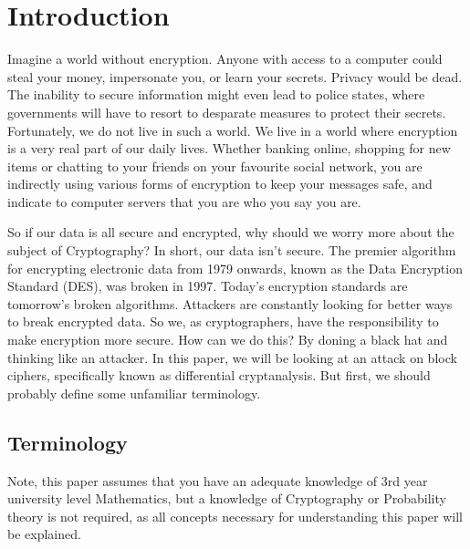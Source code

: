 



\chapter{Introduction} \label{c:introduction}
Imagine a world without encryption. Anyone with access to a computer
could steal your money, impersonate you, or learn your secrets.
Privacy would be dead. The inability to secure information might
even lead to police states, where governments will have to resort
to desparate measures to protect their secrets.
Fortunately, we do not live in such a world. We live in a world 
where encryption is a very real part of our daily lives. Whether
banking online, shopping for new items or chatting to your friends
on your favourite social network, you are indirectly using various
forms of encryption to keep your messages safe, and indicate to
computer servers that you are who you say you are.

So if our data is all secure and encrypted, why should we worry 
more about the subject of Cryptography? In short, our data isn't
secure. The premier algorithm for encrypting electronic data from
1979 onwards, known as the Data Encryption Standard (DES), was
broken in 1997. Today's encryption standards are tomorrow's broken
algorithms. Attackers are constantly looking for better ways
to break encrypted data. So we, as cryptographers, have the 
responsibility to make encryption more secure. How can we do this? 
By doning a black hat and thinking like an attacker. In this paper, 
we will be looking at an attack on block ciphers, specifically known 
as differential cryptanalysis. But first, we should probably define 
some unfamiliar terminology.

\section{Terminology}

\begin{rem}
Note, this paper assumes that you have an adequate knowledge of
3rd year university level Mathematics, but a knowledge of 
Cryptography or Probability theory is not required, as all 
concepts necessary for understanding this paper will be explained.
\end{rem}

